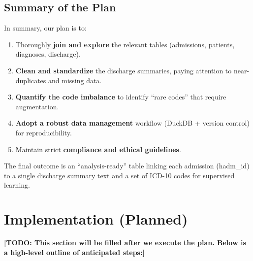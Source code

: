 \subsection{Summary of the Plan}
In summary, our plan is to:
\begin{enumerate}
    \item Thoroughly \textbf{join and explore} the relevant tables (admissions, patients, diagnoses, discharge).
    \item \textbf{Clean and standardize} the discharge summaries, paying attention to near-duplicates and missing data.
    \item \textbf{Quantify the code imbalance} to identify “rare codes” that require augmentation.
    \item \textbf{Adopt a robust data management} workflow (DuckDB + version control) for reproducibility.
    \item Maintain strict \textbf{compliance and ethical guidelines}.
\end{enumerate}
The final outcome is an “analysis-ready” table linking each admission (hadm\_id) to a single discharge summary text and a set of ICD-10 codes for supervised learning.

\section{Implementation (Planned)}

\textbf{[TODO: This section will be filled after we execute the plan. Below is a high-level outline of anticipated steps:]} 

